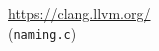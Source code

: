 \begin{frame}{}
  \begin{center}

    \vspace{0.30cm}
    \url{https://clang.llvm.org/}\\[5pt]
    (\texttt{naming.c})
  \end{center}
\end{frame}







